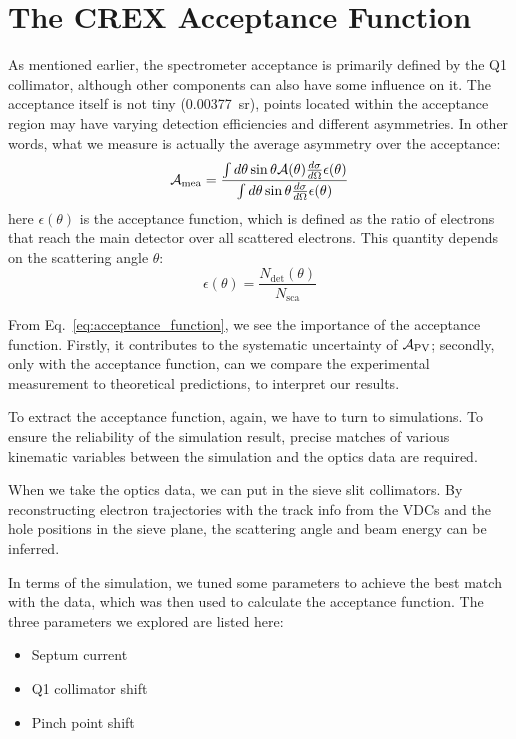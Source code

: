 \section{The CREX Acceptance Function}
As mentioned earlier, the spectrometer acceptance is primarily defined by the Q1 
collimator, although other components can also have some influence on it. 
The acceptance itself is not tiny (0.00377~sr), points located within the acceptance
region may have varying detection efficiencies and different asymmetries. In other words, 
what we measure is actually the average asymmetry over the acceptance:
\begin{equation}
    \mathcal{A}_{\text{mea}} = \frac{\int d\theta \sin\theta \mathcal{A}(\theta) \frac{d\sigma}{d\Omega} \epsilon(\theta)}{\int d\theta \sin\theta \frac{d\sigma}{d\Omega} \epsilon(\theta)}
    \label{eq:acceptance_function}
\end{equation}
here $\epsilon(\theta)$ is the acceptance function, which is defined as
the ratio of electrons that reach the main detector over all scattered
electrons. This quantity depends on the scattering angle $\theta$:
\begin{equation}
    \epsilon(\theta) = \frac{N_{\text{det}}(\theta)}{N_{\text{sca}}}
    \label{eq:acceptance_definition}
\end{equation}

From Eq.~\ref{eq:acceptance_function}, we see the importance of the acceptance
function. Firstly, it contributes to the systematic uncertainty of $\mathcal{A}_{\text{PV}}$;
secondly, only with the acceptance function, can we compare
the experimental measurement to theoretical predictions, to interpret our
results.

To extract the acceptance function, again, we have to turn to simulations. 
To ensure the reliability of the simulation result, precise matches of 
various kinematic variables between the simulation and the optics data are required. 

When we take the optics data, we can put in the sieve slit collimators.
By reconstructing electron trajectories with the track info from the VDCs 
and the hole positions in the sieve plane, the scattering angle and beam energy
can be inferred.

In terms of the simulation, we tuned some parameters to achieve the best
match with the data, which was then used to calculate the acceptance
function. The three parameters we explored are listed here:
\begin{itemize}
    \item Septum current
    \item Q1 collimator shift
    \item Pinch point shift
\end{itemize}

